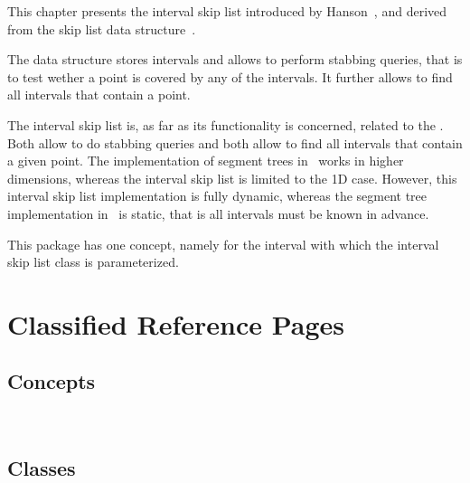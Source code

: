 This chapter presents the interval skip list introduced by Hanson~\cite{h-islds-91},
and derived from the skip list data structure~\cite{p-slpab-90}.

The data structure stores intervals and allows to perform stabbing queries,
that is to test wether a point is covered by any of the intervals.
It further allows to find all intervals that contain a point.

The interval skip list is, as far as its functionality is concerned,
related to the . Both allow to do stabbing queries
and both allow to find all intervals that contain a given point.  The
implementation of segment trees in \cgal\ works in higher
dimensions, whereas the interval skip list is limited to the 1D
case. However, this interval skip list implementation is fully
dynamic, whereas the segment tree implementation in \cgal\ is
static, that is all intervals must be known in advance.

This package has one concept, namely for the interval with which 
the interval skip list class is parameterized.



\section{Classified Reference Pages}

\subsection*{Concepts}

\\


\subsection*{Classes}

\\
\\
\\

